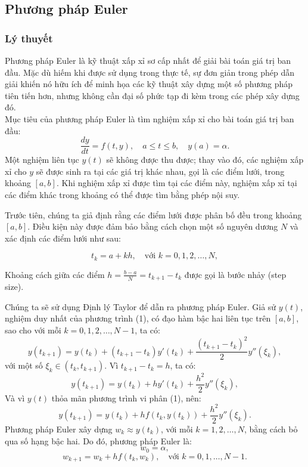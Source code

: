 \documentclass[a4paper,15pt]{article}
\begin{document}
\subsection{Phương pháp Euler}
\subsubsection{Lý thuyết}
Phương pháp Euler là kỹ thuật xấp xỉ sơ cấp nhất để giải bài toán giá trị ban đầu. Mặc dù hiếm khi được sử dụng trong thực tế, sự đơn giản trong phép dẫn giải khiến nó hữu ích để minh họa các kỹ thuật xây dựng một số phương pháp tiên tiến hơn, nhưng không cần đại số phức tạp đi kèm trong các phép xây dựng đó.\\
Mục tiêu của phương pháp Euler là tìm nghiệm xấp xỉ cho bài toán giá trị ban đầu:
\begin{equation}
    \frac{dy}{dt} = f(t, y), \quad a \leq t \leq b, \quad y(a) = \alpha.
\end{equation}
Một nghiệm liên tục \( y(t) \) sẽ không được thu được; thay vào đó, các nghiệm xấp xỉ cho \( y \) sẽ được sinh ra tại các giá trị khác nhau, gọi là các điểm lưới, trong khoảng \( [a, b] \). Khi nghiệm xấp xỉ được tìm tại các điểm này, nghiệm xấp xỉ tại các điểm khác trong khoảng có thể được tìm bằng phép nội suy.

Trước tiên, chúng ta giả định rằng các điểm lưới được phân bố đều trong khoảng \( [a, b] \). Điều kiện này được đảm bảo bằng cách chọn một số nguyên dương \( N \) và xác định các điểm lưới như sau:

\[
t_k = a + k h, \quad \text{với } k = 0, 1, 2, \ldots, N,
\]

Khoảng cách giữa các điểm \( h = \frac{b - a}{N} = t_{k+1} - t_k \) được gọi là bước nhảy (step size).

Chúng ta sẽ sử dụng Định lý Taylor để dẫn ra phương pháp Euler. Giả sử \( y(t) \), nghiệm duy nhất của phương trình (1), có đạo hàm bậc hai liên tục trên \( [a, b] \), sao cho với mỗi \( k = 0, 1, 2, \ldots, N-1 \), ta có:
\[
y(t_{k+1}) = y(t_k) + (t_{k+1} - t_k) y'(t_k) + \frac{(t_{k+1} - t_k)^2}{2} y''(\xi_k),
\]
với một số \( \xi_k \in (t_k, t_{k+1}) \). Vì \( t_{k+1} - t_k = h \), ta có:
\[
y(t_{k+1}) = y(t_k) + h y'(t_k) + \frac{h^2}{2} y''(\xi_k),
\]
Và vì \( y(t) \) thỏa mãn phương trình vi phân (1), nên:
\begin{equation}
    y(t_{k+1}) = y(t_k) + h f(t_k, y(t_k)) + \frac{h^2}{2} y''(\xi_k).
\end{equation}
Phương pháp Euler xây dựng \( w_k \approx y(t_k) \), với mỗi \( k = 1, 2, \ldots, N \), bằng cách bỏ qua số hạng bậc hai. Do đó, phương pháp Euler là:
\[
w_0 = \alpha,
\]
\begin{equation}
    w_{k+1} = w_k + h f(t_k, w_k), \quad \text{với } k = 0, 1, \ldots, N - 1.
\end{equation}
\end{document}

